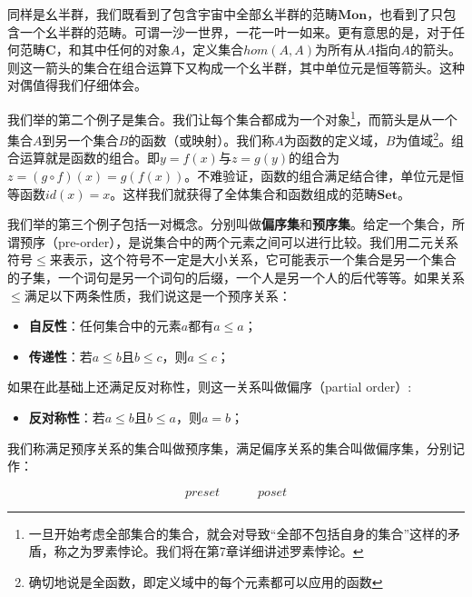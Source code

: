 \documentclass[b5paper]{ctexart}
\begin{document}
同样是幺半群，我们既看到了包含宇宙中全部幺半群的范畴$\pmb{Mon}$，也看到了只包含一个幺半群的范畴。可谓一沙一世界，一花一叶一如来。更有意思的是，对于任何范畴$\pmb{C}$，和其中任何的对象$A$，定义集合$hom(A, A)$为所有从$A$指向$A$的箭头。则这一箭头的集合在组合运算下又构成一个幺半群，其中单位元是恒等箭头。这种对偶值得我们仔细体会。

我们举的第二个例子是集合。我们让每个集合都成为一个对象\footnote{一旦开始考虑全部集合的集合，就会对导致“全部不包括自身的集合”这样的矛盾，称之为罗素悖论。我们将在第7章详细讲述罗素悖论。}，而箭头是从一个集合$A$到另一个集合$B$的函数（或映射）。我们称$A$为函数的定义域，$B$为值域\footnote{确切地说是全函数，即定义域中的每个元素都可以应用的函数}。组合运算就是函数的组合。即$y = f(x)$与$z = g(y)$的组合为$z = (g \circ f)(x) = g(f(x))$。不难验证，函数的组合满足结合律，单位元是恒等函数$id(x) = x$。这样我们就获得了全体集合和函数组成的范畴$\pmb{Set}$。

 
我们举的第三个例子包括一对概念。分别叫做\textbf{偏序集}和\textbf{预序集}。给定一个集合，所谓预序（pre-order），是说集合中的两个元素之间可以进行比较。我们用二元关系符号$\leq$来表示，这个符号不一定是大小关系，它可能表示一个集合是另一个集合的子集，一个词句是另一个词句的后缀，一个人是另一个人的后代等等。如果关系$\leq$满足以下两条性质，我们说这是一个预序关系：

\begin{itemize}
\item \textbf{自反性}：任何集合中的元素$a$都有$a \leq a$；
\item \textbf{传递性}：若$a \leq b$且$b \leq c$，则$a \leq c$；
\end{itemize}

如果在此基础上还满足反对称性，则这一关系叫做偏序（partial order）:

\begin{itemize}
\item \textbf{反对称性}：若$a \leq b$且$b \leq a$，则$a = b$；
\end{itemize}

我们称满足预序关系的集合叫做预序集，满足偏序关系的集合叫做偏序集，分别记作：

\[
preset \quad \quad \quad poset
\]
\end{document}
